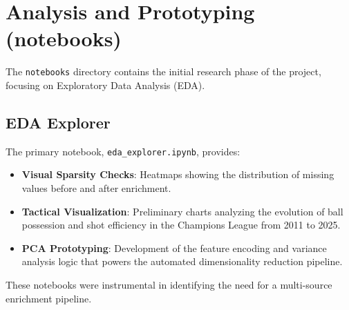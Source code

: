 \section{Analysis and Prototyping (notebooks)}
The \texttt{notebooks} directory contains the initial research phase of the project, focusing on Exploratory Data Analysis (EDA).

\subsection{EDA Explorer}
The primary notebook, \texttt{eda\_explorer.ipynb}, provides:
\begin{itemize}
    \item \textbf{Visual Sparsity Checks}: Heatmaps showing the distribution of missing values before and after enrichment.
    \item \textbf{Tactical Visualization}: Preliminary charts analyzing the evolution of ball possession and shot efficiency in the Champions League from 2011 to 2025.
    \item \textbf{PCA Prototyping}: Development of the feature encoding and variance analysis logic that powers the automated dimensionality reduction pipeline.
\end{itemize}
These notebooks were instrumental in identifying the need for a multi-source enrichment pipeline.
